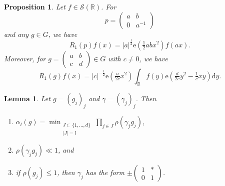 \documentclass[10pt,a4paper]{amsart}
\newtheorem{prop}{Proposition}
\newtheorem{lem}{Lemma}
\newcommand{\R}{\mathbb{R}}
\newcommand{\cS}{\mathcal{S}}
\newcommand{\dd}{\mathrm{d}}
\newcommand{\e}{\mathrm{e}}
\begin{document}
\begin{prop}
  \label{prop:oscillator}
  Let $f\in\cS(\R)$.
  For 
  \begin{equation}
    \label{eq:poscillator}
    p =
    \begin{pmatrix}
      a & b \\
      0 & a^{-1}
    \end{pmatrix}
  \end{equation}
  and any $g \in G$, we have
  \begin{equation}
    \label{eq:poscillator1}
    R_1(p)f(x) = |a|^{\frac{1}{2}} \e( \tfrac{1}{2}  ab x^2) f(ax).
  \end{equation}
  Moreover, for $ g = 
  \begin{pmatrix}
    a & b \\
    c & d
  \end{pmatrix}
  \in G$ with $c \neq 0$, we have
  \begin{equation}
    \label{eq:Fouriertransform}
    R_1(g)f(x) = |c |^{-\frac{1}{2}} \e ( \tfrac{a}{2c}x^2) \int_{\R} f(y) \e( \tfrac{d}{2c}y^2 - \tfrac{1}{c} x y) \dd y.
  \end{equation}
\end{prop}

\begin{lem}
  \label{lem:shortestvector}
  Let $g = (g_j)_j$ and $\gamma = (\gamma_j)_j$.
  Then
  \begin{enumerate}[{\rm (i)}]
  \item $\alpha_l(g) = \min_{\substack{J \subset \{1, \dots, d\} \\ |J| = l}} \prod_{j \in J} \rho(\gamma_j g_j)$,
    
  \item $\rho(\gamma_j g_j) \ll 1$, and
    
  \item if $\rho(g_j) \leq 1$, then $\gamma_j$ has the form $
  \pm \begin{pmatrix}
    1 & * \\
    0 & 1
  \end{pmatrix}
  $.
  \end{enumerate}
\end{lem}
\end{document}
